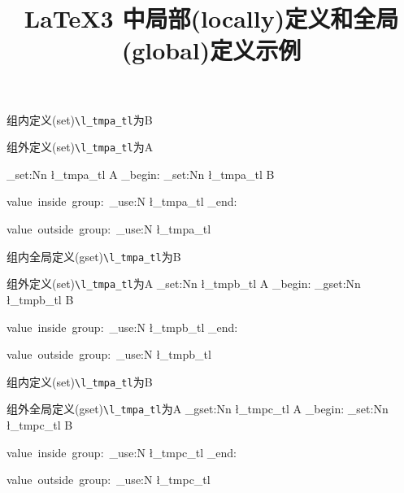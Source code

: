 \documentclass{ctexart}
\title{\LaTeX3 中局部(locally)定义和全局(global)定义示例}
\begin{document}
	\maketitle
	
	\ExplSyntaxOn
	\medskip
	\par 组内定义(set)\verb|\l_tmpa_tl|为B
	\par 组外定义(set)\verb|\l_tmpa_tl|为A
	
	\tl_set:Nn \l_tmpa_tl {A}
	\group_begin:
	\tl_set:Nn \l_tmpa_tl {B} 
	\par value~inside~group:~\tl_use:N \l_tmpa_tl
	\group_end:
	\par value~outside~group:~\tl_use:N \l_tmpa_tl
	
	\medskip
	\par 组内全局定义(gset)\verb|\l_tmpa_tl|为B
	\par 组外定义(set)\verb|\l_tmpa_tl|为A
	\tl_set:Nn \l_tmpb_tl {A}
	\group_begin:
	\tl_gset:Nn \l_tmpb_tl {B}
	\par value~inside~group:~\tl_use:N \l_tmpb_tl
	\group_end:
	\par value~outside~group:~\tl_use:N \l_tmpb_tl
	
	\medskip
	\par 组内定义(set)\verb|\l_tmpa_tl|为B
	\par 组外全局定义(gset)\verb|\l_tmpa_tl|为A
	\tl_gset:Nn \l_tmpc_tl {A}
	\group_begin:
	\tl_set:Nn \l_tmpc_tl {B}
	\par value~inside~group:~\tl_use:N \l_tmpc_tl
	\group_end:
	\par value~outside~group:~\tl_use:N \l_tmpc_tl
	
	\ExplSyntaxOff
\end{document}
